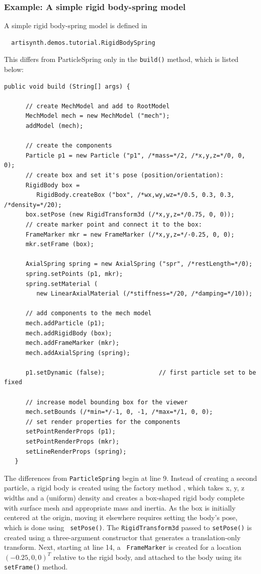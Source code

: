 \subsubsection{Example: A simple rigid body-spring model}
\label{RigidBodySpringExample:sec}

A simple rigid body-spring model is defined in
%
\begin{verbatim}
  artisynth.demos.tutorial.RigidBodySpring
\end{verbatim}
%
This differs from ParticleSpring only in the {\tt build()} method,
which is listed below:
\lstset{numbers=left}
\begin{lstlisting}[]
   public void build (String[] args) {

      // create MechModel and add to RootModel
      MechModel mech = new MechModel ("mech");
      addModel (mech);

      // create the components
      Particle p1 = new Particle ("p1", /*mass=*/2, /*x,y,z=*/0, 0, 0);
      // create box and set it's pose (position/orientation):
      RigidBody box =
         RigidBody.createBox ("box", /*wx,wy,wz=*/0.5, 0.3, 0.3, /*density=*/20);
      box.setPose (new RigidTransform3d (/*x,y,z=*/0.75, 0, 0));
      // create marker point and connect it to the box:
      FrameMarker mkr = new FrameMarker (/*x,y,z=*/-0.25, 0, 0);
      mkr.setFrame (box);

      AxialSpring spring = new AxialSpring ("spr", /*restLength=*/0);
      spring.setPoints (p1, mkr);
      spring.setMaterial (
         new LinearAxialMaterial (/*stiffness=*/20, /*damping=*/10));

      // add components to the mech model
      mech.addParticle (p1);
      mech.addRigidBody (box);
      mech.addFrameMarker (mkr);
      mech.addAxialSpring (spring);

      p1.setDynamic (false);               // first particle set to be fixed

      // increase model bounding box for the viewer
      mech.setBounds (/*min=*/-1, 0, -1, /*max=*/1, 0, 0);  
      // set render properties for the components
      setPointRenderProps (p1);
      setPointRenderProps (mkr);
      setLineRenderProps (spring);
   }
\end{lstlisting}
\lstset{numbers=none} 
The differences from {\tt ParticleSpring} begin
at line 9. Instead of creating a second particle, a rigid body is
created using the factory method
, which
takes x, y, z widths and a (uniform) density and creates a box-shaped
rigid body complete with surface mesh and appropriate mass and
inertia. As the box is initially centered at the origin, moving it
elsewhere requires setting the body's pose, which is done using {\tt
setPose()}. The {\tt RigidTransform3d} passed to {\tt setPose()} is
created using a three-argument constructor that generates a
translation-only transform.  Next, starting at line 14, a {\tt
FrameMarker} is created for a location $(-0.25, 0, 0)^T$ relative to the
rigid body, and attached to the body using its {\tt setFrame()}
method.

